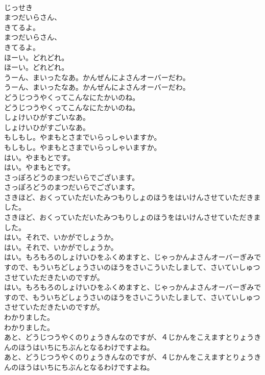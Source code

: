 \documentclass[8pt]{extreport}
\begin{document}
\begin{CJK}{UTF8}{min}
\\	じっせき
\\	まつだいらさん、
\\	きてるよ。	
\\	まつだいらさん、
\\	きてるよ。 
\\	ほーい。どれどれ。	
\\	ほーい。どれどれ。 
\\	うーん、まいったなあ。かんぜんによさんオーバーだわ。	
\\	うーん、まいったなあ。かんぜんによさんオーバーだわ。 
\\	どうじつうやくってこんなにたかいのね。	
\\	どうじつうやくってこんなにたかいのね。 
\\	しょけいひがすごいなあ。	
\\	しょけいひがすごいなあ。 
\\	もしもし。やまもとさまでいらっしゃいますか。	
\\	もしもし。やまもとさまでいらっしゃいますか。 
\\	はい。やまもとです。	
\\	はい。やまもとです。 
\\	さっぽろどうのまつだいらでございます。	
\\	さっぽろどうのまつだいらでございます。 
\\	さきほど、おくっていただいたみつもりしょのほうをはいけんさせていただきました。	
\\	さきほど、おくっていただいたみつもりしょのほうをはいけんさせていただきました。 
\\	はい。それで、いかがでしょうか。	
\\	はい。それで、いかがでしょうか。 
\\	はい。もろもろのしょけいひをふくめますと、じゃっかんよさんオーバーぎみですので、もういちどしょうさいのほうをさいこういたしまして、さいていしゅつさせていただきたいのですが。	
\\	はい。もろもろのしょけいひをふくめますと、じゃっかんよさんオーバーぎみですので、もういちどしょうさいのほうをさいこういたしまして、さいていしゅつさせていただきたいのですが。 
\\	わかりました。	
\\	わかりました。 
\\	あと、どうじつうやくのりょうきんなのですが、４じかんをこえますとりょうきんのほうはいちにちぶんとなるわけですよね。	
\\	あと、どうじつうやくのりょうきんなのですが、４じかんをこえますとりょうきんのほうはいちにちぶんとなるわけですよね。 

\end{CJK}
\end{document}
